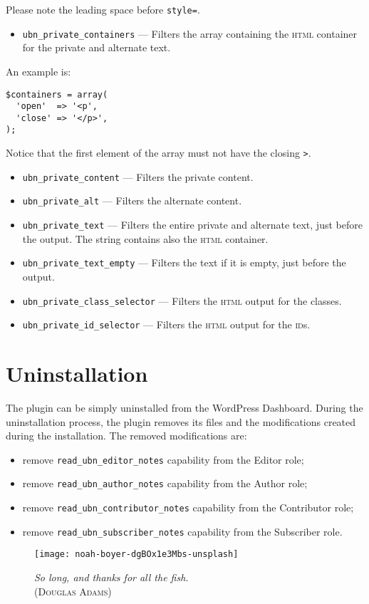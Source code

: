 Please note the leading space before \verb+style=+.

\begin{itemize}
 \item \verb+ubn_private_containers+ --- Filters the array containing the
 \textsc{html} container for the private and alternate text.
\end{itemize}

An example is:

\begin{lstlisting}
$containers = array(
  'open'  => '<p',
  'close' => '</p>',
);
\end{lstlisting}

Notice that the first element of the array must not have the closing \verb+>+.

\begin{itemize}
 \item \verb+ubn_private_content+ --- Filters the private content.
 \item \verb+ubn_private_alt+ --- Filters the alternate content.
 \item \verb+ubn_private_text+ --- Filters the entire private and alternate text,
 just before the output. The string contains also the \textsc{html} container.
 \item \verb+ubn_private_text_empty+ --- Filters the text if it is empty, just
 before the output.
 \item \verb+ubn_private_class_selector+ --- Filters the \textsc{html} output for
 the classes.
 \item \verb+ubn_private_id_selector+ --- Filters the \textsc{html} output for the
 \textsc{id}s.
\end{itemize}



\chapter{Uninstallation}

The plugin can be simply uninstalled from the WordPress Dashboard. During the
uninstallation process, the plugin removes its files and the modifications
created during the installation. The removed modifications are:

\begin{itemize}
  \item remove \texttt{read\_ubn\_editor\_notes} capability from the Editor role;
  \item remove \texttt{read\_ubn\_author\_notes} capability from the Author role;
  \item remove \texttt{read\_ubn\_contributor\_notes} capability from the Contributor role;
  \item remove \texttt{read\_ubn\_subscriber\_notes} capability from the Subscriber role.
\end{itemize}

\vfill

\begin{figure}[h]
	\centering
	\texttt{[image: noah-boyer-dgBOx1e3Mbs-unsplash]}
  \caption{\emph{So long, and thanks for all the fish.}\\(\textsc{Douglas Adams})}
	\label{fig:dolphin}
\end{figure}

